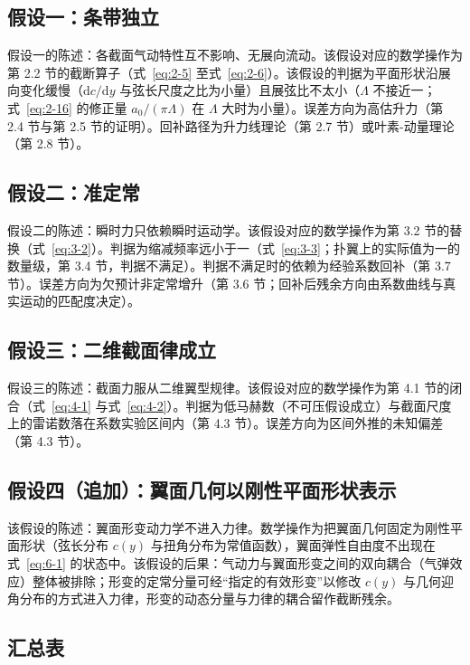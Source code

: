 \documentclass[11pt,a4paper]{ctexart}
\numberwithin{equation}{section}
\begin{document}
\subsection{假设一：条带独立}

假设一的陈述：各截面气动特性互不影响、无展向流动。该假设对应的数学操作为第 2.2 节的截断算子（式~\eqref{eq:2-5} 至式~\eqref{eq:2-6}）。该假设的判据为平面形状沿展向变化缓慢（$\mathrm{d}c/\mathrm{d}y$ 与弦长尺度之比为小量）且展弦比不太小（$\Lambda$ 不接近一；式~\eqref{eq:2-16} 的修正量 $a_0/(\pi\Lambda)$ 在 $\Lambda$ 大时为小量）。误差方向为高估升力（第 2.4 节与第 2.5 节的证明）。回补路径为升力线理论（第 2.7 节）或叶素-动量理论（第 2.8 节）。

\subsection{假设二：准定常}

假设二的陈述：瞬时力只依赖瞬时运动学。该假设对应的数学操作为第 3.2 节的替换（式~\eqref{eq:3-2}）。判据为缩减频率远小于一（式~\eqref{eq:3-3}；扑翼上的实际值为一的数量级，第 3.4 节，判据不满足）。判据不满足时的依赖为经验系数回补（第 3.7 节）。误差方向为欠预计非定常增升（第 3.6 节；回补后残余方向由系数曲线与真实运动的匹配度决定）。

\subsection{假设三：二维截面律成立}

假设三的陈述：截面力服从二维翼型规律。该假设对应的数学操作为第 4.1 节的闭合（式~\eqref{eq:4-1} 与式~\eqref{eq:4-2}）。判据为低马赫数（不可压假设成立）与截面尺度上的雷诺数落在系数实验区间内（第 4.3 节）。误差方向为区间外推的未知偏差（第 4.3 节）。

\subsection{假设四（追加）：翼面几何以刚性平面形状表示}

该假设的陈述：翼面形变动力学不进入力律。数学操作为把翼面几何固定为刚性平面形状（弦长分布 $c(y)$ 与扭角分布为常值函数），翼面弹性自由度不出现在式~\eqref{eq:6-1} 的状态中。该假设的后果：气动力与翼面形变之间的双向耦合（气弹效应）整体被排除；形变的定常分量可经“指定的有效形变”以修改 $c(y)$ 与几何迎角分布的方式进入力律，形变的动态分量与力律的耦合留作截断残余。

\subsection{汇总表}
\end{document}
